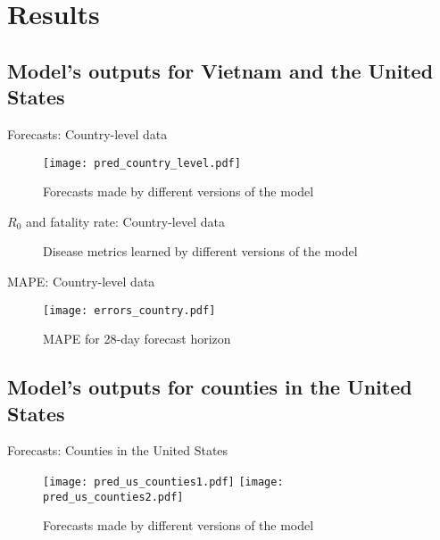\section{Results}

\subsection{Model's outputs for Vietnam and the United States}

\begin{frame}{Forecasts: Country-level data}
    \begin{figure}[!htb]
        \centering
        \texttt{[image: pred\_country\_level.pdf]}
        \caption{Forecasts made by different versions of the model}
    \end{figure}
\end{frame}

\begin{frame}{$R_0$ and fatality rate: Country-level data}
    \begin{figure}[!htb]
        \centering
        \caption{Disease metrics learned by different versions of the model}
    \end{figure}
\end{frame}

\begin{frame}{MAPE: Country-level data}
    \begin{figure}[h]
        \centering
        \texttt{[image: errors\_country.pdf]}
        \caption{MAPE for 28-day forecast horizon}
    \end{figure}
\end{frame}

\subsection{Model's outputs for counties in the United States}

\begin{frame}{Forecasts: Counties in the United States}
    \begin{figure}[!htb]
        \centering
        \texttt{[image: pred\_us\_counties1.pdf]}
        \texttt{[image: pred\_us\_counties2.pdf]}
        \caption{Forecasts made by different versions of the model}
    \end{figure}
\end{frame}

